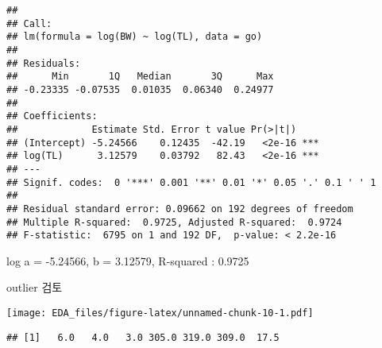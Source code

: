 \documentclass[
]{article}
\newenvironment{Shaded}{\begin{snugshade}}{\end{snugshade}}
\newcommand{\AttributeTok}[1]{\textcolor[rgb]{0.77,0.63,0.00}{#1}}
\newcommand{\CommentTok}[1]{\textcolor[rgb]{0.56,0.35,0.01}{\textit{#1}}}
\newcommand{\DecValTok}[1]{\textcolor[rgb]{0.00,0.00,0.81}{#1}}
\newcommand{\FunctionTok}[1]{\textcolor[rgb]{0.00,0.00,0.00}{#1}}
\newcommand{\NormalTok}[1]{#1}
\newcommand{\OtherTok}[1]{\textcolor[rgb]{0.56,0.35,0.01}{#1}}
\newcommand{\SpecialCharTok}[1]{\textcolor[rgb]{0.00,0.00,0.00}{#1}}
\newcommand{\StringTok}[1]{\textcolor[rgb]{0.31,0.60,0.02}{#1}}
\begin{document}
\begin{verbatim}
## 
## Call:
## lm(formula = log(BW) ~ log(TL), data = go)
## 
## Residuals:
##      Min       1Q   Median       3Q      Max 
## -0.23335 -0.07535  0.01035  0.06340  0.24977 
## 
## Coefficients:
##             Estimate Std. Error t value Pr(>|t|)    
## (Intercept) -5.24566    0.12435  -42.19   <2e-16 ***
## log(TL)      3.12579    0.03792   82.43   <2e-16 ***
## ---
## Signif. codes:  0 '***' 0.001 '**' 0.01 '*' 0.05 '.' 0.1 ' ' 1
## 
## Residual standard error: 0.09662 on 192 degrees of freedom
## Multiple R-squared:  0.9725, Adjusted R-squared:  0.9724 
## F-statistic:  6795 on 1 and 192 DF,  p-value: < 2.2e-16
\end{verbatim}

log a = -5.24566, b = 3.12579, R-squared : 0.9725

outlier 검토

\begin{Shaded}
\end{Shaded}

\texttt{[image: EDA\_files/figure-latex/unnamed-chunk-10-1.pdf]}

\begin{Shaded}
\end{Shaded}

\begin{verbatim}
## [1]   6.0   4.0   3.0 305.0 319.0 309.0  17.5
\end{verbatim}

\begin{Shaded}
\end{Shaded}
\end{document}
